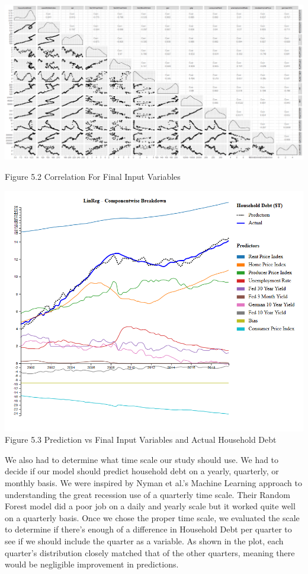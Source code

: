 \documentclass[sigconf,nonacm,11pt]{acmart}
\begin{document}
\vspace{0.5em}
\includegraphics[scale = 0.13]{Correlation_Plot_Final.png}

Figure 5.2 Correlation For Final Input Variables
\vspace{1.25em}

\includegraphics[scale = 0.25]{linreg.png}
Figure 5.3 Prediction vs Final Input Variables and Actual Household Debt 
\vspace{1.0em}


We also had to determine what time scale our study should use. We had to decide if our model should predict household debt on a yearly, quarterly, or monthly basis. We were inspired by Nyman et al.'s Machine Learning approach to understanding the great recession\cite{Nyman2018} use of a quarterly time scale.  Their Random Forest model did a poor job on a daily and yearly scale but it worked quite well on a quarterly basis. Once we chose the proper time scale, we evaluated the scale to determine if there's enough of a difference in Household Debt per quarter to see if we should include the quarter as a variable.  As shown in the plot, each quarter's distribution closely matched that of the other quarters, meaning there would be negligible improvement in predictions.
 
\end{document}
